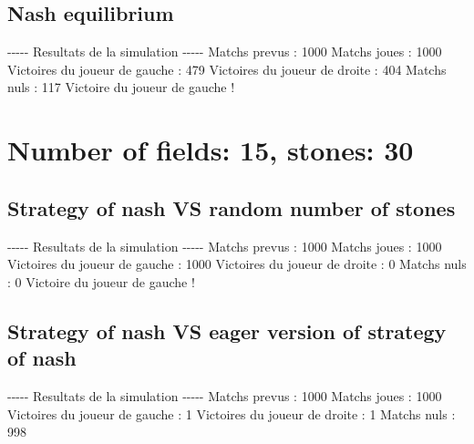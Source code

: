 \documentclass{article}%
\begin{document}
%
\subsection{Nash equilibrium}%
\label{subsec:Nash equilibrium}%
{-}{-}{-}{-}{-} Resultats de la simulation {-}{-}{-}{-}{-}\newline%
		\newline%
Matchs prevus : 1000\newline%
Matchs joues : 1000\newline%
\newline%
Victoires du joueur de gauche : 479\newline%
Victoires du joueur de droite : 404\newline%
Matchs nuls : 117\newline%
\newline%
Victoire du joueur de gauche !

%
\section{Number of fields: 15, stones: 30}%
\label{sec:Number of fields 15, stones 30}%
\subsection{Strategy of nash VS random number of stones}%
\label{subsec:Strategy of nash VS random number of stones}%
{-}{-}{-}{-}{-} Resultats de la simulation {-}{-}{-}{-}{-}\newline%
		\newline%
Matchs prevus : 1000\newline%
Matchs joues : 1000\newline%
\newline%
Victoires du joueur de gauche : 1000\newline%
Victoires du joueur de droite : 0\newline%
Matchs nuls : 0\newline%
\newline%
Victoire du joueur de gauche !

%
\subsection{Strategy of nash VS eager version of strategy of nash}%
\label{subsec:Strategy of nash VS eager version of strategy of nash}%
{-}{-}{-}{-}{-} Resultats de la simulation {-}{-}{-}{-}{-}\newline%
		\newline%
Matchs prevus : 1000\newline%
Matchs joues : 1000\newline%
\newline%
Victoires du joueur de gauche : 1\newline%
Victoires du joueur de droite : 1\newline%
Matchs nuls : 998\newline%
\newline%
\end{document}
